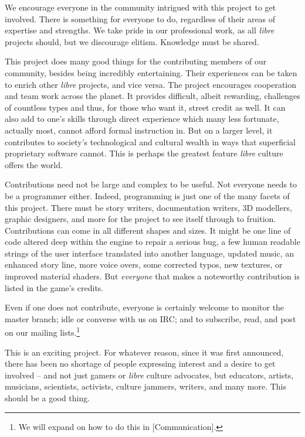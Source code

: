 
We encourage everyone in the community intrigued with this project to get involved. There is something for everyone to do, regardless of their areas of expertise and strengths. We take pride in our professional work, as all {\it libre} projects should, but we discourage elitism. Knowledge must be shared.

This project does many good things for the contributing members of our community, besides being incredibly entertaining. Their experiences can be taken to enrich other {\it libre} projects, and vice versa. The project encourages cooperation and team work across the planet. It provides difficult, albeit rewarding, challenges of countless types and thus, for those who want it, street credit as well. It can also add to one's skills through direct experience which many less fortunate, actually most, cannot afford formal instruction in. But on a larger level, it contributes to society's technological and cultural wealth in ways that superficial proprietary software cannot. This is perhaps the greatest feature {\it libre} culture offers the world.

Contributions need not be large and complex to be useful. Not everyone needs to be a programmer either. Indeed, programming is just one of the many facets of this project. There must be story writers, documentation writers, 3D modellers, graphic designers, and more for the project to see itself through to fruition. Contributions can come in all different shapes and sizes. It might be one line of code altered deep within the engine to repair a serious bug, a few human readable strings of the user interface translated into another language, updated music, an enhanced story line, more voice overs, some corrected typos, new textures, or improved material shaders. But {\it everyone} that makes a noteworthy contribution is listed in the game's credits.

Even if one does not contribute, everyone is certainly welcome to monitor the master branch; idle or converse with us on IRC; and to subscribe, read, and post on our mailing lists.\footnote{We will expand on how to do this in [Communication].}

This is an exciting project. For whatever reason, since it was first announced, there has been no shortage of people expressing interest and a desire to get involved -- and not just gamers or {\it libre} culture advocates, but educators, artists, musicians, scientists, activists, culture jammers, writers, and many more. This should be a good thing. 

